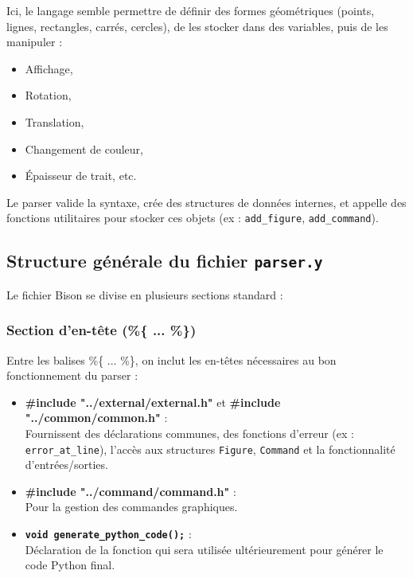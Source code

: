 \documentclass[12pt,a4paper]{article}
\begin{document}
Ici, le langage semble permettre de définir des formes géométriques (points, lignes, rectangles, carrés, cercles), de les stocker dans des variables, puis de les manipuler :
\begin{itemize}
    \item Affichage,
    \item Rotation,
    \item Translation,
    \item Changement de couleur,
    \item Épaisseur de trait, etc.
\end{itemize} 

Le parser valide la syntaxe, crée des structures de données internes, et appelle des fonctions utilitaires pour stocker ces objets (ex : \texttt{add\_figure}, \texttt{add\_command}).

\subsection{Structure générale du fichier \texttt{parser.y}}
Le fichier Bison se divise en plusieurs sections standard :

\subsubsection{Section d’en-tête (\%\{ ... \%\})}

Entre les balises \%\{ ... \%\}, on inclut les en-têtes nécessaires au bon fonctionnement du parser :

\begin{itemize}
    \item \textbf{\#include "../external/external.h"} et \textbf{\#include "../common/common.h"} : \\
    Fournissent des déclarations communes, des fonctions d’erreur (ex : \texttt{error\_at\_line}), l’accès aux structures \texttt{Figure}, \texttt{Command} et la fonctionnalité d’entrées/sorties.

    \item \textbf{\#include "../command/command.h"} : \\
    Pour la gestion des commandes graphiques.

    \item \textbf{\texttt{void generate\_python\_code();}} : \\
    Déclaration de la fonction qui sera utilisée ultérieurement pour générer le code Python final.
\end{itemize}
\end{document}
